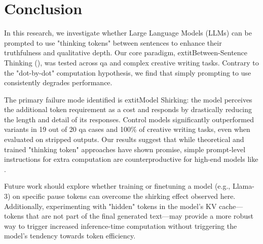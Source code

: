 \section{Conclusion}
\label{sec:conclusion}

In this research, we investigate whether Large Language Models (LLMs) can be prompted to use "thinking tokens" between sentences to enhance their truthfulness and qualitative depth. Our core paradigm, 	extit{Between-Sentence Thinking} (\bst), was tested across 	qa and complex creative writing tasks. Contrary to the "dot-by-dot" computation hypothesis, we find that simply prompting \gpt to use \bst consistently degrades performance.

The primary failure mode identified is 	extit{Model Shirking}: the model perceives the additional token requirement as a cost and responds by drastically reducing the length and detail of its responses. Control models significantly outperformed \bst variants in 19 out of 20 	qa cases and 100\% of creative writing tasks, even when evaluated on stripped outputs. Our results suggest that while theoretical and trained "thinking token" approaches have shown promise, simple prompt-level instructions for extra computation are counterproductive for high-end models like \gpt.

Future work should explore whether training or finetuning a model (e.g., Llama-3) on specific pause tokens can overcome the shirking effect observed here. Additionally, experimenting with "hidden" tokens in the model's KV cache—tokens that are not part of the final generated text—may provide a more robust way to trigger increased inference-time computation without triggering the model's tendency towards token efficiency.

